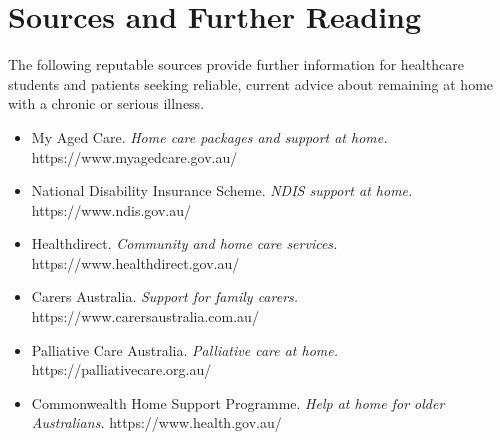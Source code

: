 \section*{Sources and Further Reading}
The following reputable sources provide further information for healthcare students and patients seeking reliable, current advice about remaining at home with a chronic or serious illness.

\begin{itemize}
    \item My Aged Care. \textit{Home care packages and support at home.} https://www.myagedcare.gov.au/
    \item National Disability Insurance Scheme. \textit{NDIS support at home.} https://www.ndis.gov.au/
    \item Healthdirect. \textit{Community and home care services.} https://www.healthdirect.gov.au/
    \item Carers Australia. \textit{Support for family carers.} https://www.carersaustralia.com.au/
    \item Palliative Care Australia. \textit{Palliative care at home.} https://palliativecare.org.au/
    \item Commonwealth Home Support Programme. \textit{Help at home for older Australians.} https://www.health.gov.au/
\end{itemize}
